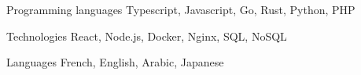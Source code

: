 

\begin{cvskills}

  \cvskill
    {Programming languages} %
    {Typescript, Javascript, Go, Rust, Python, PHP} %

  \cvskill
    {Technologies} %
    {React, Node.js, Docker, Nginx, SQL, NoSQL}  %

  \cvskill
    {Languages} %
    {French, English, Arabic, Japanese} %

\end{cvskills}
